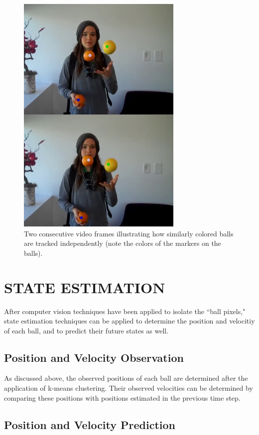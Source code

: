 \documentclass[letterpaper, 10 pt, conference]{ieeeconf}  %
\begin{document}
\begin{figure}
\centering
    \includegraphics{matching.png}
    \caption{Two consecutive video frames illustrating how similarly colored balls are tracked independently (note the colors of the markers on the balls).}
    \label{fig:matching}
\end{figure}

\section{STATE ESTIMATION}

After computer vision techniques have been applied to isolate the ``ball pixels," state estimation techniques can be applied to determine the position and velocitiy of each ball, and to predict their future states as well.

\subsection{Position and Velocity Observation}

As discussed above, the observed positions of each ball are determined after the application of k-means clustering. Their observed velocities can be determined by comparing these positions with positions estimated in the previous time step.

\subsection{Position and Velocity Prediction}
\end{document}
